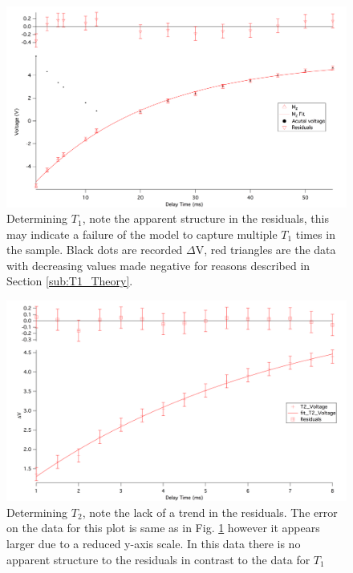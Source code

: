 \documentclass[11pt,letterpaper]{article}
\begin{document}
\begin{figure}[h!]
  \centering
      \includegraphics[scale=.3]{T1_Fit_newError.png}
      \caption{{\small Determining $T_1$, note the apparent structure in the residuals, this may indicate a failure of the model to capture multiple $T_1$ times in the sample. Black dots are recorded $\Delta$V, red triangles are the data with decreasing values made negative for reasons described in Section \ref{sub:T1_Theory}}.}
      \label{fig:T1_Fit}
\end{figure}	

\begin{figure}
  \centering
      \includegraphics[scale=.3]{T2_Fit_newError.png}
	\caption{Determining $T_2$, note the lack of a trend in the residuals. The error on the data for this plot is same as in Fig. \ref{fig:T1_Fit} however it appears larger due to a reduced y-axis scale. In this data there is no apparent structure to the residuals in contrast to the data for $T_1$}
    \label{fig:T2_Fit}
\end{figure}
\FloatBarrier
\end{document}
